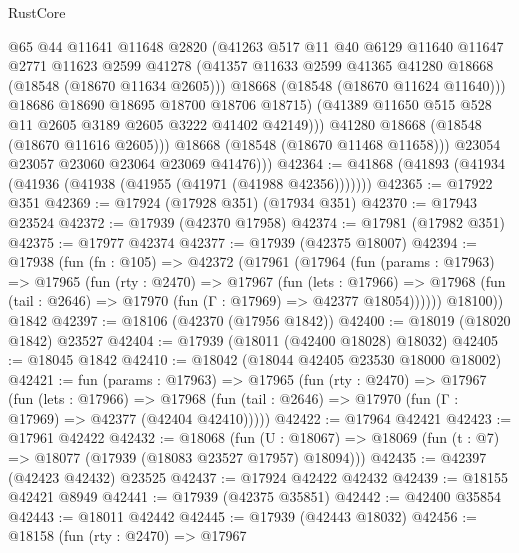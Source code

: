 \begin{lexlean}{RustCore}
\begin{coremodule}
                    @65
                    @44
                    @11641
                    @11648
                    @2820
                    (@41263
                      @517
                      @11
                      @40
                      @6129
                      @11640
                      @11647
                      @2771
                      @11623
                      @2599
                      @41278
                      (@41357 @11633 @2599 @41365 @41280 @18668 (@18548 (@18670 @11634 @2605)))
                      @18668
                      (@18548 (@18670 @11624 @11640)))
                    @18686
                    @18690
                    @18695
                    @18700
                    @18706
                    @18715)
                  (@41389 @11650 @515 @528 @11 @2605 @3189 @2605 @3222 @41402 @42149)))
              @41280
              @18668
              (@18548 (@18670 @11616 @2605)))
            @18668
            (@18548 (@18670 @11468 @11658)))
          @23054
          @23057
          @23060
          @23064
          @23069
          @41476)))
@42364 := @41868 (@41893 (@41934 (@41936 (@41938 (@41955 (@41971 (@41988 @42356)))))))
@42365 := @17922 @351
@42369 := @17924 (@17928 @351) (@17934 @351)
@42370 := @17943 @23524
@42372 := @17939 (@42370 @17958)
@42374 := @17981 (@17982 @351)
@42375 := @17977 @42374
@42377 := @17939 (@42375 @18007)
@42394 := @17938
    (fun (fn : @105) =>
    @42372
      (@17961
        (@17964
          (fun (params : @17963) =>
          @17965
            (fun (rty : @2470) =>
            @17967
              (fun (lets : @17966) =>
              @17968 (fun (tail : @2646) => @17970 (fun (Γ : @17969) => @42377 @18054))))))
        @18100))
    @1842
@42397 := @18106 (@42370 (@17956 @1842))
@42400 := @18019 (@18020 @1842) @23527
@42404 := @17939 (@18011 (@42400 @18028) @18032)
@42405 := @18045 @1842
@42410 := @18042 (@18044 @42405 @23530 @18000 @18002)
@42421 := fun (params : @17963) =>
  @17965
    (fun (rty : @2470) =>
    @17967
      (fun (lets : @17966) =>
      @17968 (fun (tail : @2646) => @17970 (fun (Γ : @17969) => @42377 (@42404 @42410)))))
@42422 := @17964 @42421
@42423 := @17961 @42422
@42432 := @18068
    (fun (U : @18067) => @18069 (fun (t : @7) => @18077 (@17939 (@18083 @23527 @17957) @18094)))
@42435 := @42397 (@42423 @42432) @23525
@42437 := @17924 @42422 @42432
@42439 := @18155 @42421 @8949
@42441 := @17939 (@42375 @35851)
@42442 := @42400 @35854
@42443 := @18011 @42442
@42445 := @17939 (@42443 @18032)
@42456 := @18158
    (fun (rty : @2470) =>
    @17967

\end{coremodule}
\end{lexlean}
